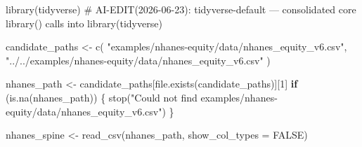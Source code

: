 \documentclass[
  letterpaper,
  DIV=11,
  numbers=noendperiod,
  oneside]{scrreprt}
\newenvironment{Shaded}{\begin{snugshade}}{\end{snugshade}}
\newcommand{\AttributeTok}[1]{\textcolor[rgb]{0.40,0.45,0.13}{#1}}
\newcommand{\CommentTok}[1]{\textcolor[rgb]{0.37,0.37,0.37}{#1}}
\newcommand{\ConstantTok}[1]{\textcolor[rgb]{0.56,0.35,0.01}{#1}}
\newcommand{\ControlFlowTok}[1]{\textcolor[rgb]{0.00,0.23,0.31}{\textbf{#1}}}
\newcommand{\DecValTok}[1]{\textcolor[rgb]{0.68,0.00,0.00}{#1}}
\newcommand{\FunctionTok}[1]{\textcolor[rgb]{0.28,0.35,0.67}{#1}}
\newcommand{\NormalTok}[1]{\textcolor[rgb]{0.00,0.23,0.31}{#1}}
\newcommand{\OtherTok}[1]{\textcolor[rgb]{0.00,0.23,0.31}{#1}}
\newcommand{\StringTok}[1]{\textcolor[rgb]{0.13,0.47,0.30}{#1}}
\begin{document}
\begin{Shaded}
\begin{Highlighting}[numbers=left,,]
\FunctionTok{library}\NormalTok{(tidyverse)  }\CommentTok{\# AI{-}EDIT(2026{-}06{-}23): tidyverse{-}default — consolidated core library() calls into library(tidyverse)}

\NormalTok{candidate\_paths }\OtherTok{\textless{}{-}} \FunctionTok{c}\NormalTok{(}
  \StringTok{"examples/nhanes{-}equity/data/nhanes\_equity\_v6.csv"}\NormalTok{,}
  \StringTok{"../../examples/nhanes{-}equity/data/nhanes\_equity\_v6.csv"}
\NormalTok{)}

\NormalTok{nhanes\_path }\OtherTok{\textless{}{-}}\NormalTok{ candidate\_paths[}\FunctionTok{file.exists}\NormalTok{(candidate\_paths)][}\DecValTok{1}\NormalTok{]}
\ControlFlowTok{if}\NormalTok{ (}\FunctionTok{is.na}\NormalTok{(nhanes\_path)) \{}
  \FunctionTok{stop}\NormalTok{(}\StringTok{"Could not find examples/nhanes{-}equity/data/nhanes\_equity\_v6.csv"}\NormalTok{)}
\NormalTok{\}}

\NormalTok{nhanes\_spine }\OtherTok{\textless{}{-}} \FunctionTok{read\_csv}\NormalTok{(nhanes\_path, }\AttributeTok{show\_col\_types =} \ConstantTok{FALSE}\NormalTok{)}


\end{Highlighting}
\end{Shaded}
\end{document}
